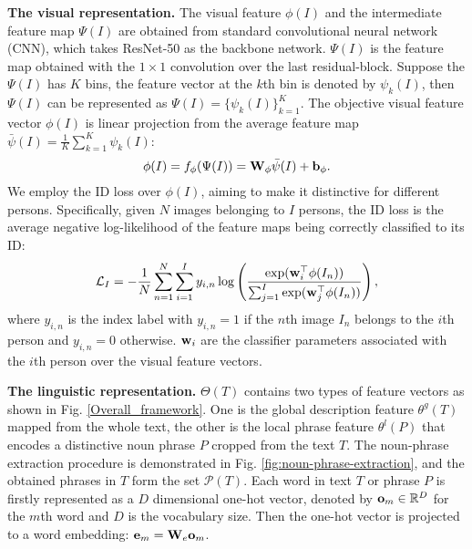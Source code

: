 \documentclass[runningheads]{llncs}
\begin{document}
\vspace{0.5em}

\noindent \textbf{The visual representation.}  The visual feature $\phi(I)$ and the intermediate feature map $\Psi(I)$ are obtained from standard convolutional neural network (CNN), which takes ResNet-50 as the backbone network. $\Psi(I)$ is the feature map obtained with the $1\!\times\!1$ convolution over the last residual-block. Suppose the $\Psi(I)$ has $K$ bins, the feature vector at the $k$th bin is denoted by $\psi_{k}(I)$, then $\Psi(I)$ can be represented as $\Psi(I) =\{ \psi_{k}(I) \}_{k=1}^{K}$.  The objective visual feature vector $\phi(I)$ is linear projection from the average feature map $\bar{\psi}(I)=\frac{1}{K}\sum_{k=1}^{K}\psi_{k}(I)$:
\begin{equation}\small
\phi(I)=f_{\phi}(\Psi(I)) = \bold{W}_{\phi}\bar{\psi}(I) + \bold{b}_{\phi}. \label{final_map}
\end{equation}
We employ the ID loss over $\phi(I)$, aiming to make it distinctive for different persons. Specifically, given $N$ images belonging to $I$ persons, the ID loss is the average negative log-likelihood of the feature maps being correctly classified to its ID:
\begin{equation}\small
 \mathcal{L}_{I} = -\frac{1}{N} \sum_{n=1}^{N}\sum_{i=1}^{I}y_{i,n} \log \left(\frac{\exp(\bold{w}_{i}^{\top} \phi(I_{n})   )}{\sum_{j=1}^{I}\exp(\bold{w}_{j}^{\top}   \phi(I_{n}))} \right), \label{Eqn:ID-loss}
\end{equation}
where $y_{i,n}$ is the index label with $y_{i,n}=1$ if the $n$th image $I_{n}$ belongs to the $i$th person and $y_{i,n} = 0$ otherwise.  $\bold{w}_{i}$ are the classifier parameters associated with the $i$th person over the visual feature vectors.


\vspace{0.5em}


\noindent \textbf{The linguistic representation.} $\Theta(T)$ contains two types of feature vectors as shown in Fig. \ref{Overall_framework}. One is the global description feature $\theta^{g}(T)$ mapped from the whole text, the other is the local phrase feature $\theta^{l}(P) $ that encodes a distinctive noun phrase $P$ cropped from the text $T$. The noun-phrase extraction procedure is demonstrated in Fig. \ref{fig:noun-phrase-extraction}, and the obtained phrases in $T$ form the set $\mathcal{P}(T)$. Each word in text $T$ or phrase $P$ is firstly represented as a $D$ dimensional one-hot vector, denoted by $\bold{o}_{m}\in \mathbb{R}^{D}$ for the $m$th word and $D$ is the vocabulary size. Then the one-hot vector is projected to a word embedding: $\bold{e}_{m} = \bold{W}_{e} \bold{o}_{m}$.  
\end{document}
